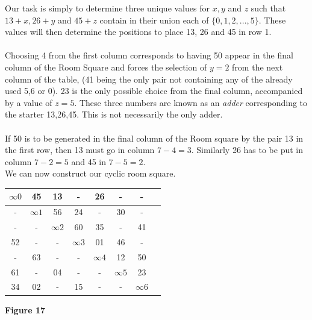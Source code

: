 \documentclass[
  12pt,
  a4paper]{book}
\begin{document}
Our task is simply to determine three unique values for \(x,y\) and
\(z\) such that \(13+x,26+y\) and \(45+z\) contain in their union each
of \(\{0,1,2,...,5\}\). These values will then determine the positions
to place 13, 26 and 45 in row 1.\\
~\\
Choosing 4 from the first column corresponds to having 50 appear in the
final column of the Room Square and forces the selection of \(y=2\) from
the next column of the table, (41 being the only pair not containing any
of the already used 5,6 or 0). 23 is the only possible choice from the
final column, accompanied by a value of \(z=5\). These three numbers are
known as an \emph{adder} corresponding to the starter 13,26,45. This is
not necessarily the only adder.\\
~\\
If 50 is to be generated in the final column of the Room square by the
pair 13 in the first row, then 13 must go in column \(7-4=3\). Similarly
26 has to be put in column \(7-2=5\) and 45 in \(7-5=2\).\\
We can now construct our cyclic room square.

\begin{longtable}[]{@{}cccccccl@{}}
\toprule
\(\infty 0\) & 45 & 13 & - & 26 & - & - &\tabularnewline
\midrule
\endhead
- & \(\infty 1\) & 56 & 24 & - & 30 & - &\tabularnewline
- & - & \(\infty 2\) & 60 & 35 & - & 41 &\tabularnewline
52 & - & - & \(\infty 3\) & 01 & 46 & - &\tabularnewline
- & 63 & - & - & \(\infty 4\) & 12 & 50 &\tabularnewline
61 & - & 04 & - & - & \(\infty 5\) & 23 &\tabularnewline
34 & 02 & - & 15 & - & - & \(\infty 6\) &\tabularnewline
\bottomrule
\end{longtable}

\textbf{Figure 17}
\end{document}
